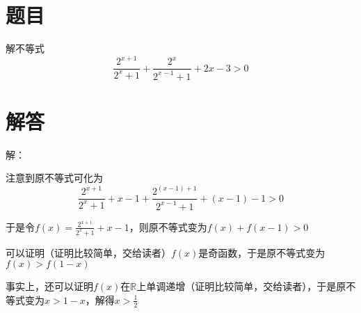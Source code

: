 \documentclass[11pt]{article}
\begin{document}
\section*{题目}
解不等式$$\frac{2^{x+1}}{2^x+1}+\frac{2^x}{2^{x-1}+1}+2x-3>0$$
\section*{解答}
解：\par
注意到原不等式可化为$$\frac{2^{x+1}}{2^x+1}+x-1+\frac{2^{(x-1)+1}}{2^{x-1}+1}+(x-1)-1>0$$ \par
于是令$f(x)=\frac{2^{x+1}}{2^x+1}+x-1$，则原不等式变为$f(x)+f(x-1)>0$ \par
可以证明（证明比较简单，交给读者）$f(x)$是奇函数，于是原不等式变为$f(x)>f(1-x)$ \par
事实上，还可以证明$f(x)$在$\mathbb{R}$上单调递增（证明比较简单，交给读者），于是原不等式变为$x>1-x$，解得$x>\frac{1}{2}$
\end{document}
